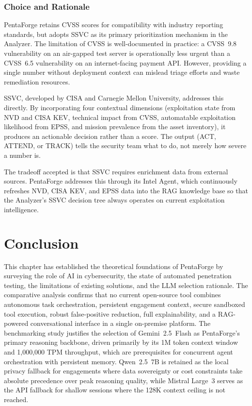 \documentclass[12pt,a4paper]{report}
\begin{document}
\subsubsection{Choice and Rationale}

PentaForge retains CVSS scores for compatibility with industry reporting
standards, but adopts SSVC as its primary prioritization mechanism in the
Analyzer. The limitation of CVSS is well-documented in practice: a
CVSS~9.8 vulnerability on an air-gapped test server is operationally less
urgent than a CVSS~6.5 vulnerability on an internet-facing payment API.
However, providing a single number without deployment context can mislead triage
efforts and waste remediation resources.

SSVC, developed by CISA and Carnegie Mellon University, addresses this
directly. By incorporating four contextual dimensions (exploitation
state from NVD and CISA KEV, technical impact from CVSS, automatable
exploitation likelihood from EPSS, and mission prevalence from the asset
inventory), it produces an actionable decision rather than a score.
The output (ACT, ATTEND, or TRACK) tells the security team what to do,
not merely how severe a number is.

The tradeoff accepted is that SSVC requires enrichment data from external
sources. PentaForge addresses this through its Intel Agent, which
continuously refreshes NVD, CISA KEV, and EPSS data into the RAG knowledge
base so that the Analyzer's SSVC decision tree always operates on current
exploitation intelligence.

\section{Conclusion}

This chapter has established the theoretical foundations of PentaForge by surveying
the role of AI in cybersecurity, the state of automated penetration testing, the
limitations of existing solutions, and the LLM selection rationale. The comparative
analysis confirms that no current open-source tool combines autonomous task
orchestration, persistent engagement context, secure sandboxed tool execution,
robust false-positive reduction, full explainability, and a RAG-powered
conversational interface in a single on-premise platform. The benchmarking study
justifies the selection of Gemini~2.5~Flash as PentaForge's primary reasoning
backbone, driven primarily by its 1M token context window and 1{,}000{,}000
TPM throughput, which are prerequisites for concurrent agent orchestration with
persistent memory. Qwen~2.5~7B is retained as the local privacy fallback for engagements
where data sovereignty or cost constraints take absolute precedence over
peak reasoning quality, while Mistral Large~3 serves as the API fallback
for shallow sessions where the 128K context ceiling is not reached.
\end{document}
